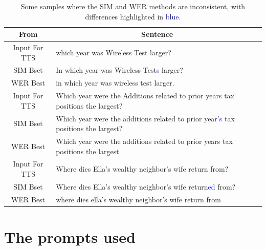 \documentclass[11pt]{article}
\begin{document}
	\begin{table}[]
		\centering
		\begin{tabular}{cl}
			\toprule[1.5pt]
			\multicolumn{1}{c}{\textbf{From}} & \multicolumn{1}{c}{\textbf{Sentence}} \\ 
			\midrule
			Input For   TTS & which year was Wireless Test   larger?                                             \\
			SIM Bset            & In which year was Wireless Test\textcolor{blue}{s} larger?                                           \\
			WER Best             & in which year was wireless test larger.                                            \\
			\midrule
			Input For TTS   & Which year were the Additions related to prior years tax   positions the largest?  \\
			SIM Bset             & Which year were the additions related to prior year\textcolor{blue}{'s} tax   positions the largest? \\
			WER Best              & Which year were the additions related to prior years tax   positions the largest   \\
			 \midrule
			Input For TTS   & Where dies Ella's wealthy neighbor's wife return from?                                      \\
			SIM Bset            & Where dies Ella's wealthy neighbor's wife return\textcolor{blue}{ed} from?                                      \\
			WER Best              & where dies ella's wealthy neighbor's wife return from                                   \\ 
			\midrule
		\end{tabular}
		\caption{Some samples where the SIM and WER methods are inconsistent, with differences highlighted in \textcolor{blue}{blue}.}
		\label{table:case_sim_wer_inconsistent}
	\end{table}
	
	
	

	
	\clearpage
	
	
	
	
	
	\section{The prompts used}\label{appendix:prompt}
\end{document}
